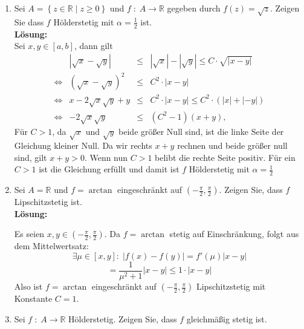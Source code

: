 \documentclass[11pt,a4paper,ngerman]{article}
\begin{document}
\begin{enumerate}[\bfseries a)]
    \item Sei $A=\left\{ z \in \mathbb{R} \; | \; z \geq 0 \right\}$ und $f \; : \; A \rightarrow \mathbb {R}$ gegeben durch $f(z) = \sqrt{z}$. Zeigen Sie dass $f$ Hölderstetig mit $\alpha = \frac{1}{2}$ ist.\\

\textbf{Lösung:}\\

Sei $x,y \in [a,b]$, dann gilt
$$
\begin{array}{lrcl}
&| \sqrt{x} - \sqrt{y} | & \leq & | \sqrt{x} | - | \sqrt{y} | \leq C \cdot \sqrt{| x - y |}\\
\Leftrightarrow & \left( \sqrt{x} - \sqrt{y} \right)^2 & \leq & C^2 \cdot |x - y|\\
\Leftrightarrow & x - 2\sqrt{x}\sqrt{y} + y &\leq& C^2 \cdot | x - y | \leq C^2 \cdot \left( |x| + |-y| \right)\\
\Leftrightarrow & - 2 \sqrt{x}\sqrt{y} &\leq& (C^2-1) (x + y),
\end{array}
$$
Für $C>1$, da $\sqrt{x}$ und $\sqrt{y}$ beide größer Null sind, ist die linke Seite der Gleichung kleiner Null. Da wir rechts $x+y$ rechnen und beide größer null sind, gilt $x+y > 0$. Wenn nun $C>1$ belibt die rechte Seite positiv. Für ein $C>1$ ist die Gleichung erfüllt und damit ist $f$ Hölderstetig mit $\alpha = \frac{1}{2}$

    \item Sei $A=\mathbb{R}$ und $f=\arctan$ eingeschränkt auf $\left( -\frac{\pi}{2},\frac{\pi}{2} \right)$. Zeigen Sie, dass $f$ Lipschitzstetig ist.\\

\textbf{Lösung:}

Es seien $x,y \in \left( -\frac{\pi}{2},\frac{\pi}{2} \right)$. Da $f=\arctan$ stetig auf Einschränkung, folgt aus dem Mittelwertsatz:\\
$$
\exists \mu \in \left[x,y\right]:\; \left| f(x) - f(y) \right| = f'(\mu) \left| x - y \right|
$$
$$
= \frac{1}{\mu^2 + 1} \left| x - y \right| \leq 1 \cdot \left| x - y \right|
$$
Also ist $f=\arctan$ eingeschränkt auf $\left( -\frac{\pi}{2},\frac{\pi}{2} \right)$ Lipschitzstetig mit Konstante $C = 1$.

\pagebreak
    \item Sei $f \; : \; A \rightarrow \mathbb{R}$ Hölderstetig. Zeigen Sie, dass $f$ gleichmäßig stetig ist.\\


\end{enumerate}
\end{document}
